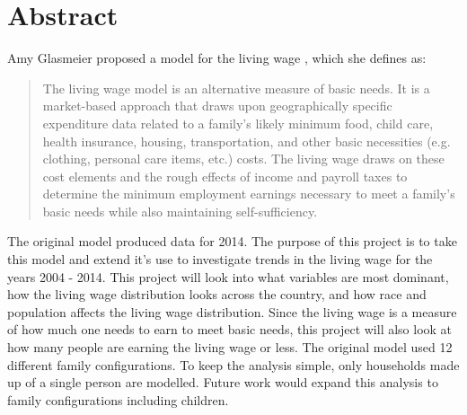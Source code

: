 \begingroup
\let\clearpage\relax
\let\cleardoublepage\relax
\let\cleardoublepage\relax

\chapter*{Abstract}

Amy Glasmeier proposed a model for the living wage \cite{glasmeier2014}, which she defines as:

\begin{quote}
The living wage model is an alternative measure of basic needs. It is a market-based approach that draws upon geographically specific expenditure data related to a family's likely minimum food, child care, health insurance, housing, transportation, and other basic necessities (e.g. clothing, personal care items, etc.) costs. The living wage draws on these cost elements and the rough effects of income and payroll taxes to determine the minimum employment earnings necessary to meet a family's basic needs while also maintaining self-sufficiency.
\end{quote}

The original model produced data for 2014. The purpose of this project is to take this model and extend it's use to investigate trends in the living wage for the years 2004 - 2014. This project will look into what variables are most dominant, how the living wage distribution looks across the country, and how race and population affects the living wage distribution. Since the living wage is a measure of how much one needs to earn to meet basic needs, this project will also look at how many people are earning the living wage or less. The original model used 12 different family configurations. To keep the analysis simple, only households made up of a single person are modelled. Future work would expand this analysis to family configurations including children.

